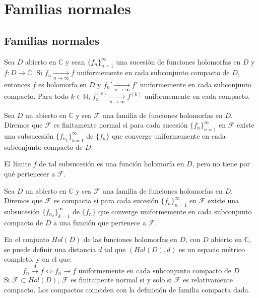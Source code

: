 \chapter{Familias normales}

\section{Familias normales}
\begin{theorem}
    Sea $D$ abierto en $\mathbb{C}$ y sean $\{f_n\}_{n=1}^\infty$ una sucesión de funciones holomorfas en $D$ y $f: D \to \mathbb{C}$.
    Si $f_n \xrightarrow[n \to \infty]{} f$ uniformemente en cada subconjunto compacto de $D$, entonces $f$ es holomorfa en $D$ y $f_n' \xrightarrow[n \to \infty]{} f'$ uniformemente en cada subconjunto compacto.
    Para todo $k \in \mathbb{N}$, $f^{(k)}_n \xrightarrow[n \to \infty]{} f^{(k)}$ uniformemente en cada compacto.
\end{theorem}

\begin{definition}
    Sea $D$ un abierto en $\mathbb{C}$ y sea $\mathcal{F}$ una familia de funciones holomorfas en $D$.
    Diremos que $\mathcal{F}$ es finitamente normal si para cada sucesión $\{f_n\}_{n=1}^\infty$ en $\mathcal{F}$ existe una subsucesión $\{f_{n_k}\}_{k=1}^\infty$ de $\{f_n\}$ que converge uniformemente en cada subconjunto compacto de $D$.
\end{definition}

\begin{remark}
    El límite $f$ de tal subsucesión es una función holomorfa en $D$, pero no tiene por qué pertenecer a $\mathcal{F}$.
\end{remark}

\begin{definition}
    Sea $D$ un abierto en $\mathbb{C}$ y sea $\mathcal{F}$ una familia de funciones holomorfas en $D$.
    Diremos que $\mathcal{F}$ es compacta si para cada sucesión $\{f_n\}_{n=1}^\infty$ en $\mathcal{F}$ existe una subsucesión $\{f_{n_k}\}_{k=1}^\infty$ de $\{f_n\}$ que converge uniformemente en cada subconjunto compacto de $D$ a una función que pertenece a $\mathcal{F}$.
\end{definition}

En el conjunto $Hol(D)$ de las funciones holomorfas en $D$, con $D$ abierto en $\mathbb{C}$, se puede definir una distancia $d$ tal que $(Hol(D), d)$ es un espacio métrico completo, y en el que:
$$f_n \xrightarrow{d} f \Leftrightarrow f_n \to f \text{ uniformemente en cada subconjunto compacto de } D$$
Si $\mathcal{F} \subset Hol(D)$, $\mathcal{F}$ es finitamente normal si y solo si $\mathcal{F}$ es relativamente compacto.
Los compactos coinciden con la definición de familia compacta dada.

